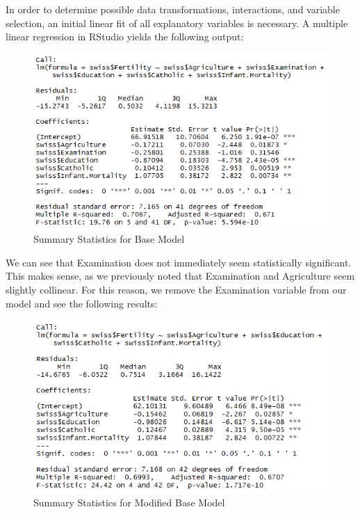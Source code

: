 \documentclass[preprint,12pt]{elsarticle}
\begin{document}
\noindent In order to determine possible data transformations, interactions, and variable selection, an initial linear fit of all explanatory variables is necessary. A multiple linear regression in RStudio yields the following output:

\begin{figure}[h!]
\centering\includegraphics[width=0.7\linewidth]{SummaryBaseModel}
\caption{Summary Statistics for Base Model}
\end{figure}

\noindent We can see that Examination does not immediately seem statistically significant. This makes sense, as we previously noted that Examination and Agriculture seem slightly collinear. For this reason, we remove the Examination variable from our model and see the following results:


\begin{figure}[h!]
\centering\includegraphics[width=0.7\linewidth]{SummaryStatsDenom}
\caption{Summary Statistics for Modified Base Model}
\end{figure}
\end{document}
